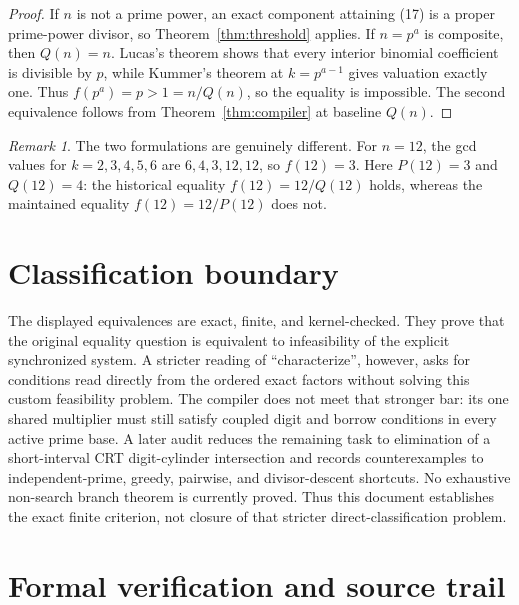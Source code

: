 \documentclass[11pt]{article}
\theoremstyle{remark}
\newtheorem{remark}[theorem]{Remark}
\begin{document}
\begin{proof}
If $n$ is not a prime power, an exact component attaining (17) is a proper
prime-power divisor, so Theorem~\ref{thm:threshold} applies.  If
$n=p^a$ is composite, then $Q(n)=n$.  Lucas's theorem shows that every
interior binomial coefficient is divisible by $p$, while Kummer's theorem at
$k=p^{a-1}$ gives valuation exactly one.  Thus $f(p^a)=p>1=n/Q(n)$, so the
equality is impossible.  The second equivalence follows from
Theorem~\ref{thm:compiler} at baseline $Q(n)$.
\end{proof}

\begin{remark}
The two formulations are genuinely different.  For $n=12$, the gcd values
for $k=2,3,4,5,6$ are $6,4,3,12,12$, so $f(12)=3$.  Here
$P(12)=3$ and $Q(12)=4$: the historical equality $f(12)=12/Q(12)$ holds,
whereas the maintained equality $f(12)=12/P(12)$ does not.
\end{remark}

\section{Classification boundary}

The displayed equivalences are exact, finite, and kernel-checked.  They prove
that the original equality question is equivalent to infeasibility of the
explicit synchronized system.  A stricter reading of ``characterize'',
however, asks for conditions read directly from the ordered exact factors
without solving this custom feasibility problem.  The compiler does not meet
that stronger bar: its one shared multiplier must still satisfy coupled digit
and borrow conditions in every active prime base.  A later audit reduces the
remaining task to elimination of a short-interval CRT digit-cylinder
intersection and records counterexamples to independent-prime, greedy,
pairwise, and divisor-descent shortcuts.  No exhaustive non-search branch
theorem is currently proved.  Thus this document establishes the exact finite
criterion, not closure of that stricter direct-classification problem.


\section{Formal verification and source trail}
\end{document}
